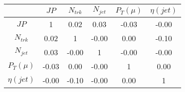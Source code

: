 \begin{tabular}{|c|c|c|c|c|c|} 
\hline
 & $JP$ & $N_{trk}$ & $N_{jet}$ & $P_{T} (\mu)$ & $\eta (jet)$ \\ \hline
$JP$ & 1 & 0.02 & 0.03 & -0.03 & -0.00 \\
$N_{trk}$ & 0.02 & 1 & -0.00 & 0.00 & -0.10 \\
$N_{jet}$ & 0.03 & -0.00 & 1 & -0.00 & -0.00 \\
$P_{T} (\mu)$ & -0.03 & 0.00 & -0.00 & 1 & 0.00 \\
$\eta (jet)$ & -0.00 & -0.10 & -0.00 & 0.00 & 1 \\
\hline 
\end{tabular} 


